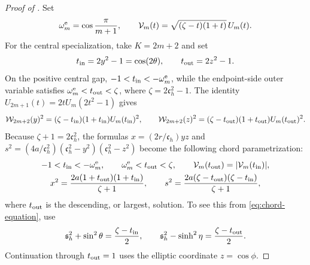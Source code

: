 \documentclass[12pt,anonymous]{iopjournal}
\numberwithin{equation}{section}
\theoremstyle{remark}
\begin{document}
\begin{proof}[Proof of ]
Set
\[
 \omega_m^{\rm e}=\cos\frac{\pi}{m+1},\qquad
 \mathcal V_m(t)=\sqrt{(\zeta-t)(1+t)}\,U_m(t).
\]
For the central specialization, take \(K=2m+2\) and set
\[
 t_{\rm in}=2y^2-1=\cos(2\theta),\qquad
 t_{\rm out}=2z^2-1.
\]
On the positive central gap,
\(-1<t_{\rm in}<-\omega_m^{\rm e}\), while the endpoint-side outer variable
satisfies
\(\omega_m^{\rm e}<t_{\rm out}<\zeta\), where
\(\zeta=2\mathfrak c_h^2-1\).  The identity
\(U_{2m+1}(t)=2tU_m(2t^2-1)\) gives
\[
 \mathcal W_{2m+2}(y)^2
  = (\zeta-t_{\rm in})(1+t_{\rm in})U_m(t_{\rm in})^2,
 \qquad
 \mathcal W_{2m+2}(z)^2
  = (\zeta-t_{\rm out})(1+t_{\rm out})U_m(t_{\rm out})^2.
\]
Because \(\zeta+1=2\mathfrak c_h^2\), the formulas
\(x=(2r/\mathfrak c_h)yz\) and
\(s^2=(4a/\mathfrak c_h^2)
(\mathfrak c_h^2-y^2)(\mathfrak c_h^2-z^2)\) become the following chord
parametrization:
\begin{equation}\label{eq:central-chord}
\begin{gathered}
 -1<t_{\rm in}<-\omega_m^{\rm e},\qquad
 \omega_m^{\rm e}<t_{\rm out}<\zeta,\qquad
 \mathcal V_m(t_{\rm out})=|\mathcal V_m(t_{\rm in})|,\\
 x^2=\frac{2a(1+t_{\rm out})(1+t_{\rm in})}{\zeta+1},\qquad
 s^2=\frac{2a(\zeta-t_{\rm out})(\zeta-t_{\rm in})}{\zeta+1},
\end{gathered}
\end{equation}
where \(t_{\rm out}\) is the descending, or largest, solution.  To see this
from \eqref{eq:chord-equation}, use
\[
 \mathfrak s_h^2+\sin^2\theta=\frac{\zeta-t_{\rm in}}{2},\qquad
 \mathfrak s_h^2-\sinh^2\eta=\frac{\zeta-t_{\rm out}}{2}.
\]
Continuation through \(t_{\rm out}=1\) uses the elliptic coordinate
\(z=\cos\phi\).


\end{proof}
\end{document}
